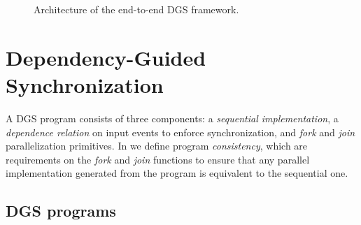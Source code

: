 \begin{figure}
  \centering
  \caption{Architecture of the end-to-end DGS framework.
  }
\label{dgs:fig:system-architecture-overview}
\end{figure}

\section{Dependency-Guided Synchronization}
\label{dgs:sec:prog-model}

A DGS program consists of three components: a
\emph{sequential implementation}, a \emph{dependence relation} on input
events to enforce synchronization, and \emph{fork} and \emph{join}
parallelization primitives.
In  we define program \emph{consistency}, which are requirements on the \emph{fork} and \emph{join} functions to ensure that any parallel implementation generated from the program is equivalent to the sequential one.

\subsection{DGS programs}
\label{dgs:ssec:prog-model-walkthrough}

